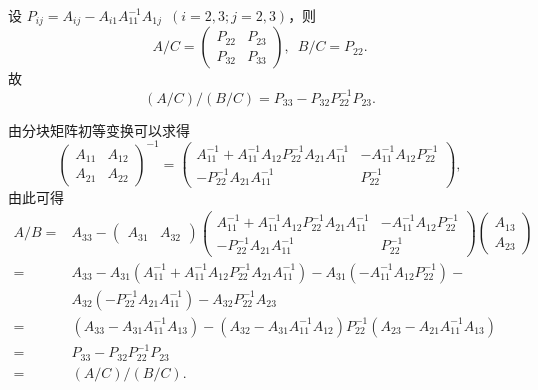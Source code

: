 \begin{exercise}
\begin{exgroup}
\begin{answer}
                设 $P_{ij} = A_{ij} - A_{i1} A_{11}^{-1} A_{1j} \enspace (i=2,3; j=2,3)$，则
                \[
                    A/C = \begin{pmatrix}
                        P_{22} & P_{23} \\
                        P_{32} & P_{33}
                    \end{pmatrix}, \enspace
                    B/C = P_{22}.
                \]
                故
                \[
                    (A/C)/(B/C) = P_{33} - P_{32} P_{22}^{-1} P_{23}.
                \]

                由分块矩阵初等变换可以求得
                \[
                    \begin{pmatrix}
                        A_{11} & A_{12} \\
                        A_{21} & A_{22}
                    \end{pmatrix}^{-1} = \begin{pmatrix}
                        A_{11}^{-1} + A_{11}^{-1} A_{12} P_{22}^{-1} A_{21} A_{11}^{-1} & -A_{11}^{-1} A_{12} P_{22}^{-1} \\
                        -P_{22}^{-1} A_{21} A_{11}^{-1} & P_{22}^{-1}
                    \end{pmatrix},
                \]
                由此可得
                \begin{align*}
                    A/B = {} & A_{33} - \begin{pmatrix}
                        A_{31} & A_{32}
                    \end{pmatrix} \begin{pmatrix}
                        A_{11}^{-1} + A_{11}^{-1} A_{12} P_{22}^{-1} A_{21} A_{11}^{-1} & -A_{11}^{-1} A_{12} P_{22}^{-1} \\
                        -P_{22}^{-1} A_{21} A_{11}^{-1} & P_{22}^{-1}
                    \end{pmatrix} \begin{pmatrix}
                        A_{13} \\ A_{23}
                    \end{pmatrix} \\
                    = {} & A_{33} - A_{31} \left(A_{11}^{-1} + A_{11}^{-1} A_{12} P_{22}^{-1} A_{21} A_{11}^{-1}\right) - A_{31} \left(-A_{11}^{-1} A_{12} P_{22}^{-1}\right) - \\
                      {} & A_{32} \left(-P_{22}^{-1} A_{21} A_{11}^{-1}\right) - A_{32} P_{22}^{-1} A_{23} \\
                    = {} & \left(A_{33} - A_{31} A_{11}^{-1} A_{13}\right) - \left(A_{32} - A_{31} A_{11}^{-1} A_{12}\right) P_{22}^{-1} \left(A_{23} - A_{21} A_{11}^{-1} A_{13}\right) \\
                    = {} & P_{33} - P_{32} P_{22}^{-1} P_{23} \\
                    = {} & (A/C)/(B/C).
                \end{align*}
        \end{answer}


\end{exgroup}
\end{exercise}
